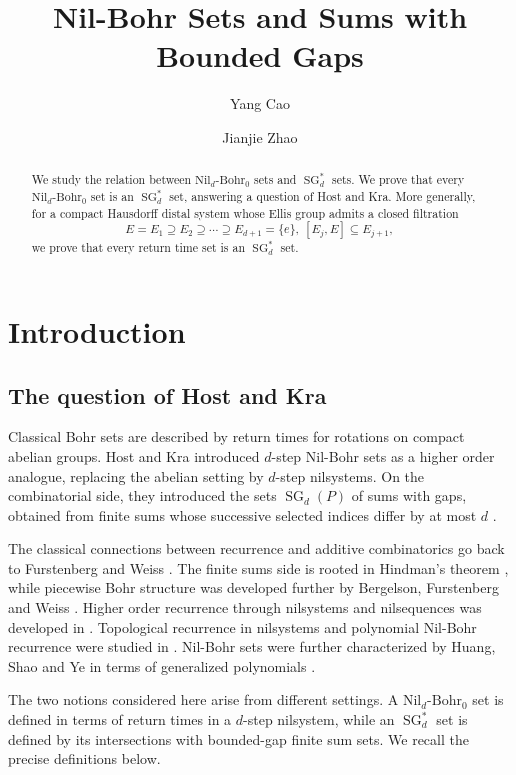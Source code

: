 \documentclass[11pt]{amsart}
\title[Nil-Bohr sets and sums with bounded gaps]
{Nil-Bohr Sets and Sums with Bounded Gaps}
\author[Y. C\MakeLowercase{ao}]{Y\MakeLowercase{ang} Cao}
\author[J. Z\MakeLowercase{hao}]{J\MakeLowercase{ianjie} Zhao}
\theoremstyle{definition}
\theoremstyle{remark}
\DeclareMathOperator{\SG}{SG}
\newcommand{\NilBohr}[1]{\mathrm{Nil}_{#1}\text{-}\mathrm{Bohr}_0}
\begin{document}
\begin{abstract}
We study the relation between $\NilBohr{d}$ sets and $\SG_d^*$ sets.  
We prove that every $\NilBohr{d}$ set is an $\SG_d^*$ set, answering a question of Host and Kra. More generally,  for a
compact Hausdorff distal system whose Ellis group admits a closed filtration
\[
E=E_1\supseteq E_2\supseteq\cdots\supseteq E_{d+1}=\{e\},
\  [E_j,E]\subseteq E_{j+1},
\]
we prove that every return time set is an $\SG_d^*$ set.
\end{abstract}
\maketitle

\section{Introduction}\label{sec:intro}

\subsection{The question of Host and Kra}\label{sec:intro-main}

Classical Bohr sets are described by return times for rotations on compact
abelian groups.  Host and Kra introduced $d$-step Nil-Bohr sets as a
higher order analogue, replacing the abelian setting by $d$-step nilsystems.
On the combinatorial side, they introduced the sets $\SG_d(P)$ of sums with
gaps, obtained from finite sums whose successive selected indices differ by at
most $d$ \cite{HostKra2011}.

The classical connections between recurrence and additive combinatorics go back
to Furstenberg and Weiss \cite{Furstenberg1981,FurstenbergWeiss1978}.
The finite sums side is rooted in Hindman's theorem \cite{Hindman1974}, while
piecewise Bohr structure was developed further by Bergelson, Furstenberg and
Weiss \cite{BergelsonFurstenbergWeiss2006}.  Higher order recurrence through
nilsystems and nilsequences was developed in
\cite{BergelsonHostKra2005,BergelsonLeibman2003,HostKra2005}.  Topological
recurrence in nilsystems and polynomial Nil-Bohr recurrence were studied in
\cite{HostKraMaass2016,Tu2014}.  Nil-Bohr sets were further characterized by
Huang, Shao and Ye in terms of generalized polynomials
\cite{HuangShaoYe2016}.

The two notions considered here arise from different settings.  A
$\NilBohr{d}$ set is defined in terms of return times in a $d$-step
nilsystem, while an $\SG_d^*$ set is defined by its intersections with
bounded-gap finite sum sets.  We recall the precise definitions below.
\end{document}
